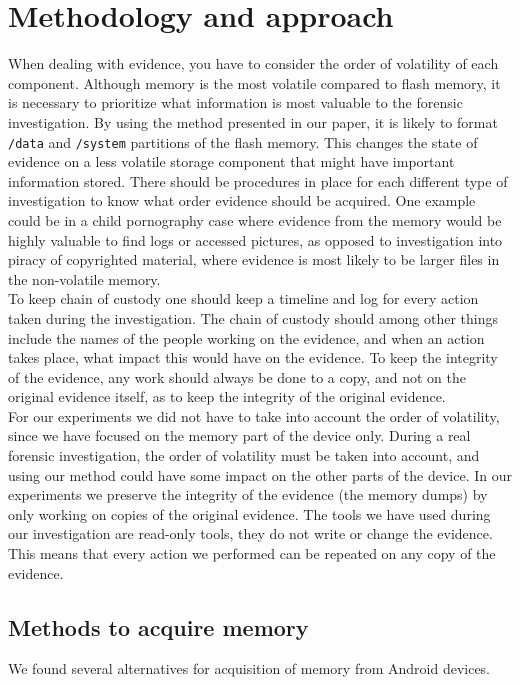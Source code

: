 \section{Methodology and approach}
When dealing with evidence, you have to consider the order of volatility of
each component. Although memory is the most volatile compared to flash memory,
it is necessary to prioritize what information is most valuable to the forensic
investigation. By using the method presented in our paper, it is likely to
format \texttt{/data} and \texttt{/system} partitions of the flash memory. This changes the state
of evidence on a less volatile storage component that might have important
information stored. There should be procedures in place for each different type
of investigation to know what order evidence should be acquired. One example
could be in a child pornography case where evidence from the memory would be
highly valuable to find logs or accessed pictures, as opposed to investigation
into piracy of copyrighted material, where evidence is most likely to be larger
files in the non-volatile memory.\\

To keep chain of custody one should keep a timeline and log for every action
taken during the investigation. The chain of custody should among other things
include the names of the people working on the evidence, and  when an action
takes place, what impact this would have on the evidence. To keep the integrity
of the evidence, any work should always be done to a copy, and not on the
original evidence itself, as to keep the integrity of the original evidence.\\

For our experiments we did not have to take into account the order of
volatility, since we have focused on the memory part of the device only. During
a real forensic investigation, the order of volatility must be taken into
account, and using our method could have some impact on the other parts of the
device. In our experiments we preserve the integrity of the evidence (the
memory dumps) by only working on copies of the original evidence. The tools we
have used during our investigation are read-only tools, they do not write or
change the evidence. This means that every action we performed can be repeated
on any copy of the evidence.

\subsection{Methods to acquire memory}
We found several alternatives for acquisition of memory from Android devices.
